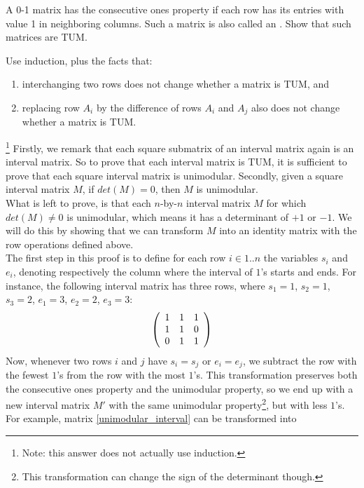 \begin{exercise}
A 0-1 matrix has the consecutive ones property if each row has its entries with value 1 in neighboring columns. Such a matrix is also called an . Show that such matrices are TUM.
\begin{hint}
Use induction, plus the facts that:
\begin{enumerate}
 \item interchanging two rows does not change whether a matrix is TUM, and
 \item replacing row $A_i$ by the difference of rows $A_i$ and $A_j$ also does not change whether a matrix is TUM.
\end{enumerate}
\end{hint}
\begin{answer}
\footnote{Note: this answer does not actually use induction.}
Firstly, we remark that each square submatrix of an interval matrix again is an interval matrix. So to prove that each interval matrix is TUM, it is sufficient to prove that each square interval matrix is unimodular. Secondly, given a square interval matrix $M$, if $det(M)=0$, then $M$ is unimodular.\\
What is left to prove, is that each $n$-by-$n$ interval matrix $M$ for which $det(M)\neq 0$ is unimodular, which means it has a determinant of $+1$ or $-1$. We will do this by showing that we can transform $M$ into an identity matrix with the row operations defined above.\\
The first step in this proof is to define for each row $i \in 1..n$ the variables $s_i$ and $e_i$, denoting respectively the column where the interval of $1$'s starts and ends. For instance, the following interval matrix has three rows, where $s_1=1$, $s_2=1$, $s_3=2$, $e_1=3$, $e_2=2$, $e_3=3$:
\begin{equation}
\label{unimodular_interval}
\left( \begin{array}{ccc}
1&1&1\\
1&1&0\\
0&1&1
\end{array} \right)
\end{equation}
Now, whenever two rows $i$ and $j$ have $s_i=s_j$ or $e_i=e_j$, we subtract the row with the fewest $1$'s from the row with the most $1$'s. This transformation preserves both the consecutive ones property and the unimodular property, so we end up with a new interval matrix $M'$ with the same unimodular property\footnote{This transformation can change the sign of the determinant though.}, but with less $1$'s. For example, matrix \ref{unimodular_interval} can be transformed into

\end{answer}
\end{exercise}
